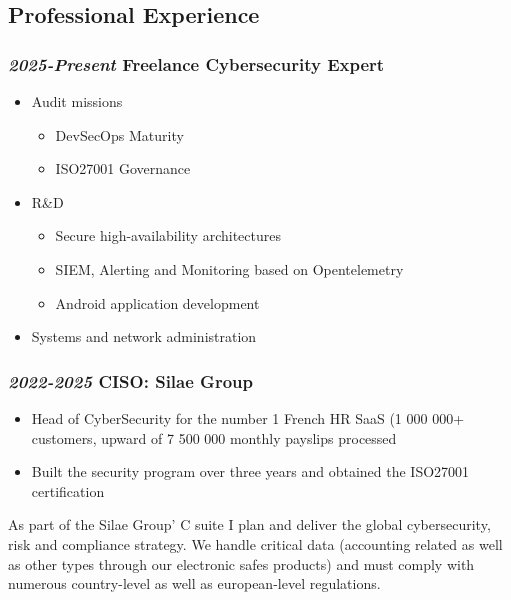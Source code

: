 \documentclass[a4paper, oneside, final]{scrartcl} %
\begin{document}
\begin{center}
\section*{Professional Experience}
\subsubsection*{\textit{\textbf{2025-Present}} Freelance Cybersecurity Expert }
\begin{itemize}
\item Audit missions
    \begin{itemize}
        \item DevSecOps Maturity
        \item ISO27001 Governance
    \end{itemize}
\item R\&D
    \begin{itemize}
        \item Secure high-availability architectures
        \item SIEM, Alerting and Monitoring based on Opentelemetry
        \item Android application development
    \end{itemize}
\item Systems and network administration
\end{itemize}

\subsubsection*{\textit{\textbf{2022-2025}} CISO: Silae Group }
\begin{itemize}
    \item Head of CyberSecurity for the number 1 French HR SaaS (1 000 000+ customers, upward of 7 500 000 monthly payslips processed
    \item Built the security program over three years and obtained the ISO27001 certification
\end{itemize}

\begin{justify}
    As part of the Silae Group' C suite I plan and deliver the global cybersecurity, risk and compliance strategy.
    We handle critical data (accounting related as well as other types through our electronic safes products) and must comply with numerous country-level as well as european-level regulations.
\end{justify}

\end{center}
\end{document}
